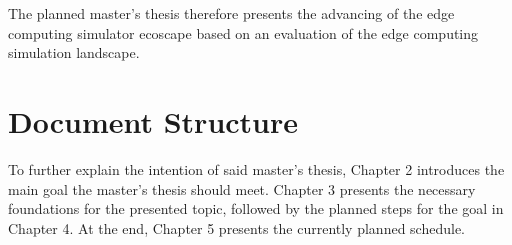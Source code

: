   
  The planned master's thesis therefore presents the advancing of the edge computing simulator ecoscape based on an evaluation of the edge computing simulation landscape.

\section{Document Structure}
To further explain the intention of said master's thesis, Chapter 2 introduces the main goal the master's thesis should meet.
Chapter 3 presents the necessary foundations for the presented topic, followed by the planned steps for the goal in Chapter 4.
At the end, Chapter 5 presents the currently planned schedule.